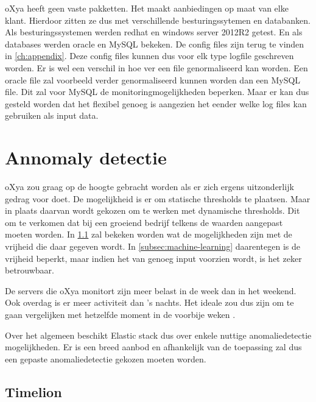 oXya heeft geen vaste pakketten. Het maakt aanbiedingen op maat van elke klant. Hierdoor zitten ze dus met verschillende besturingssytemen en databanken.
Als besturingssystemen werden redhat en windows server 2012R2 getest. En als databases werden oracle en MySQL bekeken.
De config files zijn terug te vinden in \ref{ch:appendix}. 
Deze config files kunnen dus voor elk type logfile geschreven worden. Er is wel een verschil in hoe ver een file genormaliseerd kan worden.
Een oracle file zal voorbeeld verder genormaliseerd kunnen worden dan een MySQL file. Dit zal voor MySQL de monitoringmogelijkheden beperken.
Maar er kan dus gesteld worden dat het flexibel genoeg is aangezien het eender welke log files kan gebruiken als input data.


\section{Annomaly detectie}
\label{sec:annomaly detectie}

oXya zou graag op de hoogte gebracht worden als er zich ergens uitzonderlijk gedrag voor doet. De mogelijkheid is er om statische thresholds te plaatsen.
Maar in plaats daarvan wordt gekozen om te werken met dynamische thresholds. Dit om te verkomen dat bij een groeiend bedrijf telkens de waarden aangepast moeten worden.
In \ref{subsec:timelion} zal bekeken worden wat de mogelijkheden zijn met de vrijheid die daar gegeven wordt.
In \ref{subsec:machine-learning} daarentegen is de vrijheid beperkt, maar indien het van genoeg input voorzien wordt, is het zeker betrouwbaar.

De servers die oXya monitort zijn meer belast in de week dan in het weekend. Ook overdag is er meer activiteit dan 's nachts. Het ideale zou dus zijn om te gaan vergelijken met hetzelfde moment in de voorbije weken \autocite{hourweekanalyse}.

Over het algemeen beschikt Elastic stack dus over enkele nuttige anomaliedetectie mogelijkheden. 
Er is een breed aanbod en afhankelijk van de toepassing zal dus een gepaste anomaliedetectie gekozen moeten worden.

\subsection{Timelion}
\label{subsec:timelion}

